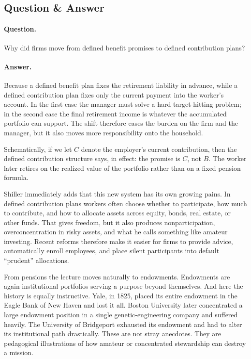\subsection{Question \& Answer}

\paragraph{Question.} Why did firms move from defined benefit promises to defined contribution plans?

\paragraph{Answer.} Because a defined benefit plan fixes the retirement liability in advance, while a defined contribution plan fixes only the current payment into the worker's account. In the first case the manager must solve a hard target-hitting problem; in the second case the final retirement income is whatever the accumulated portfolio can support. The shift therefore eases the burden on the firm and the manager, but it also moves more responsibility onto the household.

Schematically, if we let \(C\) denote the employer's current contribution, then the defined contribution structure says, in effect: the promise is \(C\), not \(B\). The worker later retires on the realized value of the portfolio rather than on a fixed pension formula.

Shiller immediately adds that this new system has its own growing pains. In defined contribution plans workers often choose whether to participate, how much to contribute, and how to allocate assets across equity, bonds, real estate, or other funds. That gives freedom, but it also produces nonparticipation, overconcentration in risky assets, and what he calls something like amateur investing. Recent reforms therefore make it easier for firms to provide advice, automatically enroll employees, and place silent participants into default ``prudent'' allocations.

From pensions the lecture moves naturally to endowments. Endowments are again institutional portfolios serving a purpose beyond themselves. And here the history is equally instructive. Yale, in 1825, placed its entire endowment in the Eagle Bank of New Haven and lost it all. Boston University later concentrated a large endowment position in a single genetic-engineering company and suffered heavily. The University of Bridgeport exhausted its endowment and had to alter its institutional path drastically. These are not stray anecdotes. They are pedagogical illustrations of how amateur or concentrated stewardship can destroy a mission.

